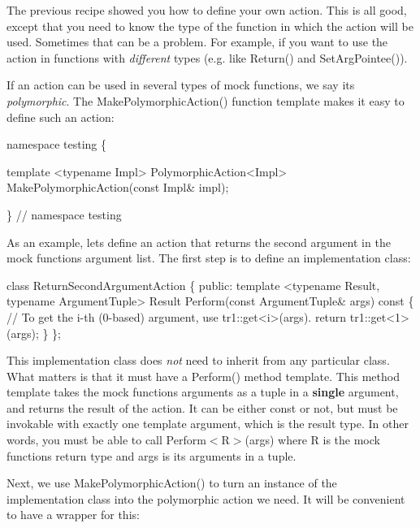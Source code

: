 The previous recipe showed you how to define your own action. This is all good, except that you need to know the type of the function in which the action will be used. Sometimes that can be a problem. For example, if you want to use the action in functions with {\itshape different} types (e.\+g. like {\ttfamily Return()} and {\ttfamily Set\+Arg\+Pointee()}).

If an action can be used in several types of mock functions, we say it\textquotesingle{}s {\itshape polymorphic}. The {\ttfamily Make\+Polymorphic\+Action()} function template makes it easy to define such an action\+:


\begin{DoxyCode}
namespace testing \{

template <typename Impl>
PolymorphicAction<Impl> MakePolymorphicAction(const Impl& impl);

\}  // namespace testing
\end{DoxyCode}


As an example, let\textquotesingle{}s define an action that returns the second argument in the mock function\textquotesingle{}s argument list. The first step is to define an implementation class\+:


\begin{DoxyCode}
class ReturnSecondArgumentAction \{
 public:
  template <typename Result, typename ArgumentTuple>
  Result Perform(const ArgumentTuple& args) const \{
    // To get the i-th (0-based) argument, use tr1::get<i>(args).
    return tr1::get<1>(args);
  \}
\};
\end{DoxyCode}


This implementation class does {\itshape not} need to inherit from any particular class. What matters is that it must have a {\ttfamily Perform()} method template. This method template takes the mock function\textquotesingle{}s arguments as a tuple in a {\bfseries single} argument, and returns the result of the action. It can be either {\ttfamily const} or not, but must be invokable with exactly one template argument, which is the result type. In other words, you must be able to call {\ttfamily Perform$<$R$>$(args)} where {\ttfamily R} is the mock function\textquotesingle{}s return type and {\ttfamily args} is its arguments in a tuple.

Next, we use {\ttfamily Make\+Polymorphic\+Action()} to turn an instance of the implementation class into the polymorphic action we need. It will be convenient to have a wrapper for this\+:



